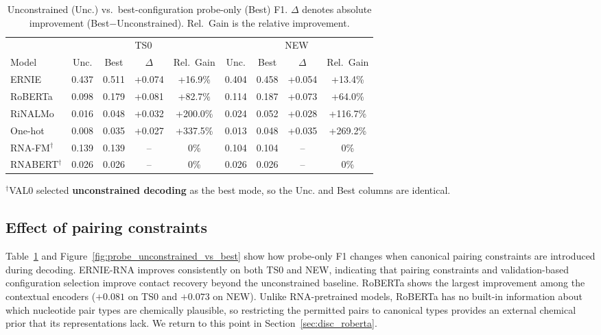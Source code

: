 \documentclass[logo,bsc,singlespacing,parskip]{infthesis}
\begin{document}
\begin{table}[t]
\centering
\caption{Unconstrained (Unc.) vs.\ best-configuration probe-only (Best) F1. 
$\Delta$ denotes absolute improvement (Best$-$Unconstrained). Rel.\ Gain is the relative improvement.}
\label{tab:probe_unconstrained_vs_best}
\setlength{\tabcolsep}{5pt}
\begin{tabular}{lcccccccc}
\toprule
& \multicolumn{4}{c}{TS0} & \multicolumn{4}{c}{NEW} \\
\cmidrule(lr){2-5} \cmidrule(lr){6-9}
Model 
& Unc. & Best & $\Delta$ & Rel.\ Gain 
& Unc. & Best & $\Delta$ & Rel.\ Gain \\
\midrule
ERNIE   & 0.437 & 0.511 & +0.074 & +16.9\% & 0.404 & 0.458 & +0.054 & +13.4\% \\
RoBERTa & 0.098 & 0.179 & +0.081 & +82.7\% & 0.114 & 0.187 & +0.073 & +64.0\% \\
RiNALMo & 0.016 & 0.048 & +0.032 & +200.0\% & 0.024 & 0.052 & +0.028 & +116.7\% \\
One-hot & 0.008 & 0.035 & +0.027 & +337.5\% & 0.013 & 0.048 & +0.035 & +269.2\% \\
RNA-FM$^\dagger$   & 0.139 & 0.139 & -- & 0\% & 0.104 & 0.104 & -- & 0\% \\
RNABERT$^\dagger$ & 0.026 & 0.026 & -- & 0\% & 0.026 & 0.026 & -- & 0\% \\
\bottomrule
\end{tabular}
{\raggedright\footnotesize $^\dagger$VAL0 selected \textbf{unconstrained decoding} as the best mode, so the Unc. and Best columns are identical.\par}
\end{table}

\subsection{Effect of pairing constraints}
Table~\ref{tab:probe_unconstrained_vs_best} and Figure~\ref{fig:probe_unconstrained_vs_best} show how probe-only F1 changes when canonical pairing constraints are introduced during decoding. ERNIE-RNA improves consistently on both TS0 and NEW, indicating that pairing constraints and validation-based configuration selection improve contact recovery beyond the unconstrained baseline. RoBERTa shows the largest improvement among the contextual encoders ($+0.081$ on TS0 and $+0.073$ on NEW). Unlike RNA-pretrained models, RoBERTa has no built-in information about which nucleotide pair types are chemically plausible, so restricting the permitted pairs to canonical types provides an external chemical prior that its representations lack. We return to this point in Section~\ref{sec:disc_roberta}.
\end{document}
